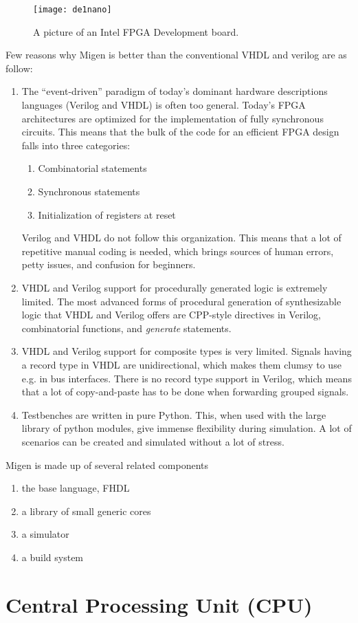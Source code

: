 \begin{figure}[p]
\texttt{[image: de1nano]}
\centering
\caption{A picture of an Intel FPGA Development board.}
\centering
\label{fig:fpga}


\end{figure}





Few reasons why Migen is better than the conventional VHDL and verilog are as follow:
\begin{enumerate}
\item The “event-driven” paradigm of today’s dominant hardware descriptions languages (Verilog and VHDL) is often too general. Today’s FPGA architectures are optimized for the implementation of fully synchronous circuits. This means that the bulk of the code for an efficient FPGA design falls into three categories:
\begin{enumerate}
\item Combinatorial statements
\item Synchronous statements
\item Initialization of registers at reset
\end{enumerate}
Verilog and VHDL do not follow this organization. This means that a lot of repetitive manual coding is needed, which brings sources of human errors, petty issues, and confusion for beginners.
\item VHDL and Verilog support for procedurally generated logic is extremely limited. The most advanced forms of procedural generation of synthesizable logic that VHDL and Verilog offers are CPP-style directives in Verilog, combinatorial functions, and  \textit{generate} statements.
\item VHDL and Verilog support for composite types is very limited. Signals having a record type in VHDL are unidirectional, which makes them clumsy to use e.g. in bus interfaces. There is no record type support in Verilog, which means that a lot of copy-and-paste has to be done when forwarding grouped signals.
\item Testbenches are written in pure Python. This, when used with the large library of python modules, give immense flexibility during simulation. A lot of scenarios can be created and simulated without a lot of stress.
\end{enumerate}

Migen is made up of several related components
\begin{enumerate}
\item the base language, FHDL
\item a library of small generic cores
\item a simulator
\item a build system
\end{enumerate}


\section[CPU]{Central Processing Unit (CPU)}





